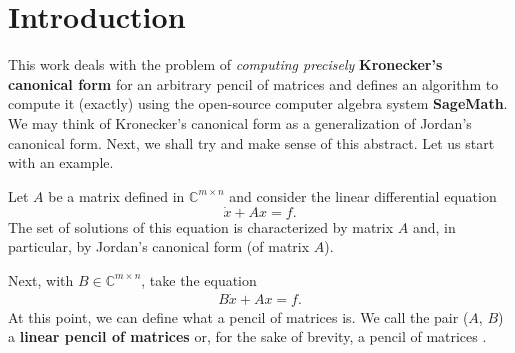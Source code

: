 \section{Introduction}
This work deals with the problem of \textit{computing precisely} \textbf{Kronecker's canonical form} for an
arbitrary pencil of matrices and defines an algorithm \linebreak to compute it (exactly) using the open-source
computer algebra system \textbf{SageMath}\cite{sage}. We may think of Kronecker's canonical form as a generalization of
Jordan's canonical form. Next, we shall try and make sense of this abstract. Let us start with an example.

Let $A$ be a matrix defined in $\mathbb{C}^{m \times n}$ and consider the linear differential equation
\[
    \dot{x} + Ax = f.
\]
The set of solutions of this equation is characterized by matrix $A$ and, in particular, by Jordan's canonical form
(of matrix $A$).

Next, with $B \in \mathbb{C}^{m \times n}$, take the equation
\begin{gather} \label{intro:1}
    B\dot{x} + Ax = f.
\end{gather}
At this point, we can define what a pencil of matrices is. We call the pair ($A$, $B$) a \textbf{linear pencil
of matrices} or, for the sake of brevity, a pencil of matrices \cite{ikramov}.

